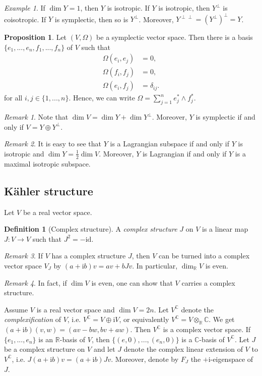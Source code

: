 \documentclass[12pt]{amsart}
\numberwithin{equation}{section}
\theoremstyle{plain}
\theoremstyle{definition}
\newtheorem{defn}{Definition}[subsection]
\newtheorem{prop}{Proposition}[subsection]
\theoremstyle{remark}
\newtheorem{rem}{Remark}[subsection]
\newtheorem{ex}{Example}[subsection]
\newcommand{\R}{\mathbb{R}}
\newcommand{\id}{\mathrm{id}}
\newcommand{\I}{\mathrm{i}}
\begin{document}
\begin{ex}
If $\dim Y=1$, then $Y$ is isotropic. If $Y$ is isotropic, then $Y^\perp$ is coisotropic. If $Y$ is symplectic, then so is $Y^\perp$. Moreover, $Y^{\perp\perp}=(Y^\perp)^\perp=Y$.
\end{ex}

\begin{prop}
Let $(V,\Omega)$ be a symplectic vector space. Then there is a basis $\{e_1,...,e_n,f_1,...,f_n\}$ of $V$ such that 
\begin{align*}
\Omega(e_i,e_j)&=0,\\
\Omega(f_i,f_j)&=0,\\
\Omega(e_i,f_j)&=\delta_{ij}.
\end{align*}
for all $i,j\in\{1,...,n\}$. Hence, we can write $\Omega=\sum_{j=1}^ne_j^*\land f_j^*$.
\end{prop}

\begin{rem}
Note that $\dim V=\dim Y+\dim Y^\perp$. Moreover, $Y$ is symplectic if and only if $V=Y\oplus Y^\perp$.
\end{rem}

\begin{rem}
It is easy to see that $Y$ is a Lagrangian subspace if and only if $Y$ is isotropic and $\dim Y=\frac{1}{2}\dim V$. Moreover, $Y$ is Lagrangian if and only if $Y$ is a maximal isotropic subspace.
\end{rem}

\subsection{K\"ahler structure}

Let $V$ be a real vector space.

\begin{defn}[Complex structure]
A \emph{complex structure} $J$ on $V$ is a linear map $J\colon V\to V$ such that $J^2=-\id$. 
\end{defn}
\begin{rem}
If $V$ has a complex structure $J$, then $V$ can be turned into a complex vector space $V_J$ by $(a+\I b)v=av+bJv$. In particular, $\dim_\R V$ is even.
\end{rem}

\begin{rem}
In fact, if $\dim V$ is even, one can show that $V$ carries a complex structure.
\end{rem}

Assume $V$ is a real vector space and $\dim V=2n$. Let $V^\mathbb{C}$ denote the \emph{complexification} of $V$, i.e. $V^\mathbb{C}=V\oplus \I V$, or equivalently $V^\mathbb{C}=V\otimes_\R \mathbb{C}$. We get $(a+\I b)(v,w)=(av-bw,bv+aw)$. Then $V^\mathbb{C}$ is a complex vector space. If $\{e_1,...,e_n\}$ is an $\R$-basis of $V$, then $\{(e,0),...,(e_n,0)\}$ is a $\mathbb{C}$-basis of $V^\mathbb{C}$. Let $J$ be a complex structure on $V$ and let $J$ denote the complex linear extension of $V$ to $V^\mathbb{C}$, i.e. $J(a+\I b)v=(a+\I b)Jv$. Moreover, denote by $F_J$ the $+\I$-eigenspace of $J$.
\end{document}
